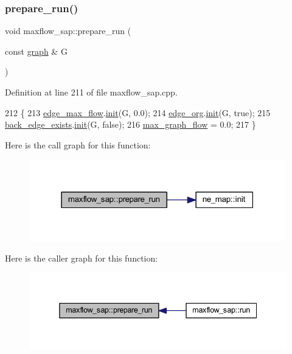 \subsubsection{\texorpdfstring{prepare\+\_\+run()}{prepare\_run()}}
{\footnotesize\ttfamily void maxflow\+\_\+sap\+::prepare\+\_\+run (\begin{DoxyParamCaption}\item[{const \mbox{\hyperlink{classgraph}{graph}} \&}]{G }\end{DoxyParamCaption})\hspace{0.3cm}{\ttfamily [protected]}}



Definition at line 211 of file maxflow\+\_\+sap.\+cpp.


\begin{DoxyCode}
212 \{
213     \mbox{\hyperlink{classmaxflow__sap_a25820db833a98efc69fc3edb79fc49d3}{edge\_max\_flow}}.\mbox{\hyperlink{classne__map_a4ef2ab4aebcb57a7a101975bf6a88e24}{init}}(G, 0.0);
214     \mbox{\hyperlink{classmaxflow__sap_ac445d8c2f7e2080e890a9cdf7413c372}{edge\_org}}.\mbox{\hyperlink{classne__map_a4ef2ab4aebcb57a7a101975bf6a88e24}{init}}(G, \textcolor{keyword}{true});
215     \mbox{\hyperlink{classmaxflow__sap_a13f2b98efc2a4f62fab4ac391ca83a51}{back\_edge\_exists}}.\mbox{\hyperlink{classne__map_a4ef2ab4aebcb57a7a101975bf6a88e24}{init}}(G, \textcolor{keyword}{false});
216     \mbox{\hyperlink{classmaxflow__sap_a77c650fd11632352a1228f2cbd38caf1}{max\_graph\_flow}} = 0.0;
217 \}
\end{DoxyCode}
Here is the call graph for this function\+:\nopagebreak
\begin{figure}[H]
\begin{center}
\leavevmode
\includegraphics[width=316pt]{classmaxflow__sap_a4504b071456d536371ff6d07055e800d_cgraph}
\end{center}
\end{figure}
Here is the caller graph for this function\+:\nopagebreak
\begin{figure}[H]
\begin{center}
\leavevmode
\includegraphics[width=338pt]{classmaxflow__sap_a4504b071456d536371ff6d07055e800d_icgraph}
\end{center}
\end{figure}
\mbox{\label{classmaxflow__sap_a14574d2f9ce31a3cdeb0888e57fc0616}} 
